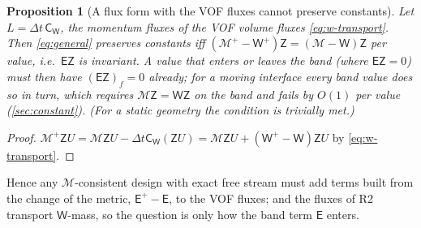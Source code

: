 \documentclass[11pt,a4paper]{article}
\newtheorem{proposition}{Proposition}
\newcommand{\dt}{\Delta t}
\newcommand{\MM}{\mathcal M}
\newcommand{\W}{\mathsf W}
\newcommand{\E}{\mathsf E}
\newcommand{\Z}{\mathsf Z}
\newcommand{\C}{\mathsf C}
\begin{document}
\begin{proposition}[A flux form with the VOF fluxes cannot preserve constants]\label{prop:flux}
Let $L=\dt\,\C_\W$, the momentum fluxes of the VOF volume fluxes \eqref{eq:w-transport}.
Then \eqref{eq:general} preserves constants iff $(\MM^+-\W^+)\Z=(\MM-\W)\Z$ per value, i.e.\
$\E\Z$ is invariant.  A value that enters or leaves the band (where $\E\Z=0$) must then have
$(\E\Z)_f=0$ already; for a moving interface every band value does so in turn, which
requires $\MM\Z=\W\Z$ on the band and fails by $O(1)$ per value (\cref{sec:constant}).  (For
a static geometry the condition is trivially met.)
\end{proposition}
\begin{proof}
$\MM^+\Z U=\MM\Z U-\dt\C_\W(\Z U)=\MM\Z U+(\W^+-\W)\Z U$ by \eqref{eq:w-transport}.
\end{proof}
Hence any $\MM$-consistent design with exact free stream must add terms built from the
change of the metric, $\E^+-\E$, to the VOF fluxes; and the fluxes of R2 transport $\W$-mass,
so the question is only how the band term $\E$ enters.

\end{document}
